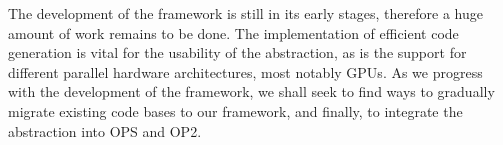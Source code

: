 \documentclass[fontsize=11pt, appendixprefix=true]{scrreprt}
\begin{document}
The development of the framework is still in its early stages, therefore a huge
amount of work remains to be done. The implementation of efficient code
generation is vital for the usability of the abstraction, as is the support for
different parallel hardware architectures, most notably GPUs. As we progress
with the development of the framework, we shall seek to find ways to gradually
migrate existing code bases to our framework, and finally, to integrate the
abstraction into OPS and OP2.

\printbibliography

\end{document}
